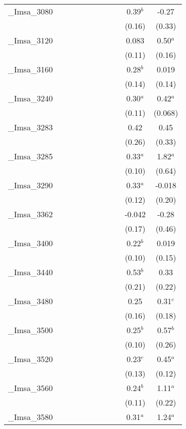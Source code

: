 \documentclass[]{article}
\begin{document}
\begin{tabular}{lcccccccccc}
\_Imsa\_3080 &  &  &  &  &  &  &  &  & 0.39$^b$ & -0.27 \\
 &  &  &  &  &  &  &  &  & (0.16) & (0.33) \\
\_Imsa\_3120 &  &  &  &  &  &  &  &  & 0.083 & 0.50$^a$ \\
 &  &  &  &  &  &  &  &  & (0.11) & (0.16) \\
\_Imsa\_3160 &  &  &  &  &  &  &  &  & 0.28$^b$ & 0.019 \\
 &  &  &  &  &  &  &  &  & (0.14) & (0.14) \\
\_Imsa\_3240 &  &  &  &  &  &  &  &  & 0.30$^a$ & 0.42$^a$ \\
 &  &  &  &  &  &  &  &  & (0.11) & (0.068) \\
\_Imsa\_3283 &  &  &  &  &  &  &  &  & 0.42 & 0.45 \\
 &  &  &  &  &  &  &  &  & (0.26) & (0.33) \\
\_Imsa\_3285 &  &  &  &  &  &  &  &  & 0.33$^a$ & 1.82$^a$ \\
 &  &  &  &  &  &  &  &  & (0.10) & (0.64) \\
\_Imsa\_3290 &  &  &  &  &  &  &  &  & 0.33$^a$ & -0.018 \\
 &  &  &  &  &  &  &  &  & (0.12) & (0.20) \\
\_Imsa\_3362 &  &  &  &  &  &  &  &  & -0.042 & -0.28 \\
 &  &  &  &  &  &  &  &  & (0.17) & (0.46) \\
\_Imsa\_3400 &  &  &  &  &  &  &  &  & 0.22$^b$ & 0.019 \\
 &  &  &  &  &  &  &  &  & (0.10) & (0.15) \\
\_Imsa\_3440 &  &  &  &  &  &  &  &  & 0.53$^b$ & 0.33 \\
 &  &  &  &  &  &  &  &  & (0.21) & (0.22) \\
\_Imsa\_3480 &  &  &  &  &  &  &  &  & 0.25 & 0.31$^c$ \\
 &  &  &  &  &  &  &  &  & (0.16) & (0.18) \\
\_Imsa\_3500 &  &  &  &  &  &  &  &  & 0.25$^b$ & 0.57$^b$ \\
 &  &  &  &  &  &  &  &  & (0.10) & (0.26) \\
\_Imsa\_3520 &  &  &  &  &  &  &  &  & 0.23$^c$ & 0.45$^a$ \\
 &  &  &  &  &  &  &  &  & (0.13) & (0.12) \\
\_Imsa\_3560 &  &  &  &  &  &  &  &  & 0.24$^b$ & 1.11$^a$ \\
 &  &  &  &  &  &  &  &  & (0.11) & (0.22) \\
\_Imsa\_3580 &  &  &  &  &  &  &  &  & 0.31$^a$ & 1.24$^a$ \\

\end{tabular}
\end{document}
